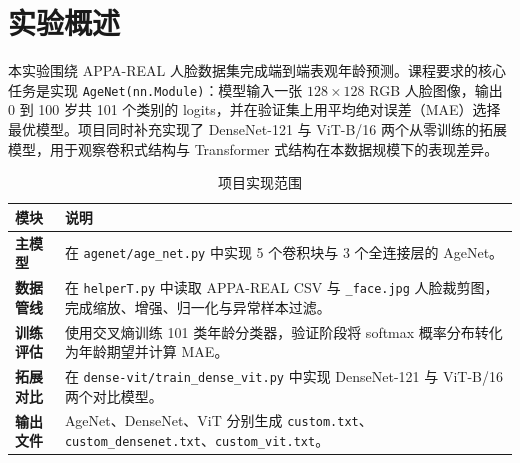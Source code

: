 \documentclass[12pt,a4paper,fontset=fandol]{ctexart}
\begin{document}
\begin{titlepage}
  \vphantom{.}
\end{titlepage}

\tableofcontents
\newpage
{}

\section{实验概述}

本实验围绕 APPA-REAL 人脸数据集完成端到端表观年龄预测。课程要求的核心任务是实现 \texttt{AgeNet(nn.Module)}：模型输入一张 $128\times128$ RGB 人脸图像，输出 0 到 100 岁共 101 个类别的 logits，并在验证集上用平均绝对误差（MAE）选择最优模型。项目同时补充实现了 DenseNet-121 与 ViT-B/16 两个从零训练的拓展模型，用于观察卷积式结构与 Transformer 式结构在本数据规模下的表现差异。

\begin{table}[H]
  \centering
  \caption{项目实现范围}
  \begin{tabularx}{\textwidth}{>{\bfseries}p{3.1cm}X}
    \toprule
    模块 & 说明 \\
    \midrule
    主模型 & 在 \texttt{agenet/age\_net.py} 中实现 5 个卷积块与 3 个全连接层的 AgeNet。 \\
    数据管线 & 在 \texttt{helperT.py} 中读取 APPA-REAL CSV 与 \texttt{\_face.jpg} 人脸裁剪图，完成缩放、增强、归一化与异常样本过滤。 \\
    训练评估 & 使用交叉熵训练 101 类年龄分类器，验证阶段将 softmax 概率分布转化为年龄期望并计算 MAE。 \\
    拓展对比 & 在 \texttt{dense-vit/train\_dense\_vit.py} 中实现 DenseNet-121 与 ViT-B/16 两个对比模型。 \\
    输出文件 & AgeNet、DenseNet、ViT 分别生成 \texttt{custom.txt}、\texttt{custom\_densenet.txt}、\texttt{custom\_vit.txt}。 \\
    \bottomrule
  \end{tabularx}
\end{table}
\end{document}
